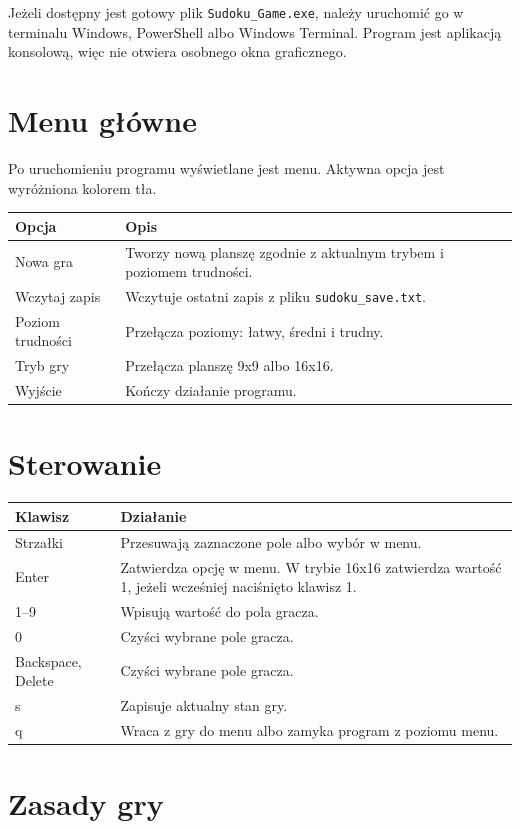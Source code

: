 \documentclass[12pt,a4paper]{article}
\begin{document}
Jeżeli dostępny jest gotowy plik \texttt{Sudoku\_Game.exe}, należy uruchomić go
w terminalu Windows, PowerShell albo Windows Terminal. Program jest aplikacją
konsolową, więc nie otwiera osobnego okna graficznego.

\section{Menu główne}

Po uruchomieniu programu wyświetlane jest menu. Aktywna opcja jest wyróżniona
kolorem tła.

\begin{longtable}{p{}p{}}
\textbf{Opcja} & \textbf{Opis} \\
\hline
Nowa gra & Tworzy nową planszę zgodnie z aktualnym trybem i poziomem trudności. \\
Wczytaj zapis & Wczytuje ostatni zapis z pliku \texttt{sudoku\_save.txt}. \\
Poziom trudności & Przełącza poziomy: łatwy, średni i trudny. \\
Tryb gry & Przełącza planszę 9x9 albo 16x16. \\
Wyjście & Kończy działanie programu. \\
\end{longtable}

\section{Sterowanie}

\begin{longtable}{p{}p{}}
\textbf{Klawisz} & \textbf{Działanie} \\
\hline
Strzałki & Przesuwają zaznaczone pole albo wybór w menu. \\
Enter & Zatwierdza opcję w menu. W trybie 16x16 zatwierdza wartość 1, jeżeli wcześniej naciśnięto klawisz 1. \\
1--9 & Wpisują wartość do pola gracza. \\
0 & Czyści wybrane pole gracza. \\
Backspace, Delete & Czyści wybrane pole gracza. \\
s & Zapisuje aktualny stan gry. \\
q & Wraca z gry do menu albo zamyka program z poziomu menu. \\
\end{longtable}

\section{Zasady gry}
\end{document}
